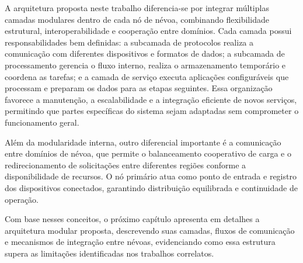 A arquitetura proposta neste trabalho diferencia-se por integrar múltiplas camadas modulares dentro de cada nó de névoa, combinando flexibilidade estrutural, interoperabilidade e cooperação entre domínios. Cada camada possui responsabilidades bem definidas: a subcamada de protocolos realiza a comunicação com diferentes dispositivos e formatos de dados; a subcamada de processamento gerencia o fluxo interno, realiza o armazenamento temporário e coordena as tarefas; e a camada de serviço executa aplicações configuráveis que processam e preparam os dados para as etapas seguintes. Essa organização favorece a manutenção, a escalabilidade e a integração eficiente de novos serviços, permitindo que partes específicas do sistema sejam adaptadas sem comprometer o funcionamento geral.

Além da modularidade interna, outro diferencial importante é a comunicação entre domínios de névoa, que permite o balanceamento cooperativo de carga e o redirecionamento de solicitações entre diferentes regiões conforme a disponibilidade de recursos. O nó primário atua como ponto de entrada e registro dos dispositivos conectados, garantindo distribuição equilibrada e continuidade de operação.

Com base nesses conceitos, o próximo capítulo apresenta em detalhes a arquitetura modular proposta, descrevendo suas camadas, fluxos de comunicação e mecanismos de integração entre névoas, evidenciando como essa estrutura supera as limitações identificadas nos trabalhos correlatos.
